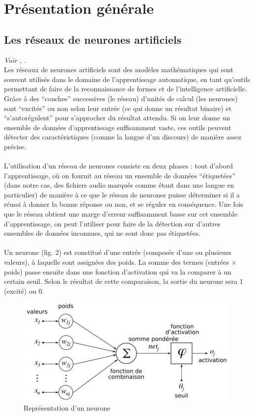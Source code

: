 \documentclass{article}
\begin{document}
\newpage
\section{Présentation générale}

\subsection{Les réseaux de neurones artificiels}

\textit{Voir \cite{jodouin90}, \cite{lecun2015}.}\\

Les réseaux de neurones artificiels sont des modèles mathématiques qui sont souvent utilisés dans le domaine de l'apprentissage automatique, en tant qu'outils permettant de faire de la reconnaissance de formes et de l'intelligence artificielle. Grâce à des ``couches'' successives (le réseau) d'unités de calcul (les neurones) sont ``excités'' ou non selon leur entrée (ce qui donne un résultat binaire) et ``s'autorégulent'' pour s'approcher du résultat attendu. Si on leur donne un ensemble de données d'apprentissage suffisamment vaste, ces outils peuvent détecter des caractéristiques (comme la langue d'un discours) de manière assez précise.\\
\\
L'utilisation d'un réseau de neurones consiste en deux phases : tout d'abord l'apprentissage, où on fournit au réseau un ensemble de données ``étiquetées'' (dans notre cas, des fichiers audio marqués comme étant dans une langue en particulier) de manière à ce que le réseau de neurones puisse déterminer si il a réussi à donner la bonne réponse ou non, et se réguler en conséquence. Une fois que le réseau obtient une marge d'erreur suffisamment basse sur cet ensemble d'apprentissage, on peut l'utiliser pour faire de la détection sur d'autres ensembles de données inconnues, qui ne sont donc pas étiquetées.\\
\\
Un neurone (fig. 2) est constitué d'une entrée (composée d'une ou plusieurs valeurs), à laquelle sont assignées des poids. La somme des termes (entrées $\times$ poids) passe ensuite dans une fonction d'activation qui va la comparer à un certain seuil. Selon le résultat de cette comparaison, la sortie du neurone sera 1 (excité) ou 0.\\

\begin{figure}[h]
  \centerline{\includegraphics[scale=0.6]{img/neurone.png}}
  \caption{Représentation d'un neurone}
\end{figure}
\end{document}
